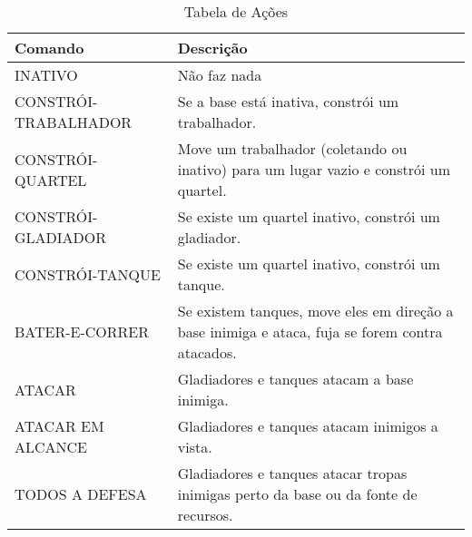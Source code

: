 \begin{table}[]
    \caption{Tabela de Ações}
    \begin{tabular}{|l|p{8cm}|}
    \hline
    Comando              & Descrição                                                                                       \\
    \hline
    INATIVO              & Não faz nada                                                                                    \\
    \hline
    CONSTRÓI-TRABALHADOR & Se a base está inativa, constrói um trabalhador.                                                \\
    \hline
    CONSTRÓI-QUARTEL     & Move um trabalhador (coletando ou inativo) para um lugar vazio e constrói um quartel.           \\
    \hline
    CONSTRÓI-GLADIADOR   & Se existe um quartel inativo, constrói um gladiador.                                            \\
    \hline
    CONSTRÓI-TANQUE      & Se existe um quartel inativo, constrói um tanque.                                               \\
    \hline
    BATER-E-CORRER       & Se existem tanques, move eles em direção a base inimiga e ataca, fuja se forem contra atacados. \\
    \hline
    ATACAR               & Gladiadores e tanques atacam a base inimiga.                                                    \\
    \hline
    ATACAR EM ALCANCE    & Gladiadores e tanques atacam inimigos a vista.                                                  \\
    \hline
    TODOS A DEFESA       & Gladiadores e tanques atacar tropas inimigas perto da base ou da fonte de recursos.             \\
    \hline
    \end{tabular}
\end{table}

